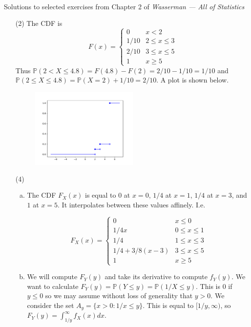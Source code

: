 \documentclass[10pt]{article}
\renewcommand{\P}{\mathbb{P}}
\begin{document}
\noindent \large{Solutions to selected exercises from Chapter 2 of
\emph{Wasserman --- All of Statistics}}

\begin{enumerate}
\item[(2)]
The CDF is
\[
F(x) =
    \begin{cases}
      0 & x < 2 \\
      1/10 & 2\leq x\leq 3 \\
      2/10 & 3\leq x \leq 5 \\
      1 & x\geq 5
   \end{cases}
\]
Thus $\P(2<X\leq 4.8) = F(4.8)-F(2)=2/10-1/10=1/10$ and
$\P(2\leq X\leq 4.8)=\P(X=2)+1/10=2/10$. A plot is shown below.

\begin{figure}[h]
\centering
\includegraphics[width=0.5\textwidth]{2.pdf}
\end{figure}

\item[(4)]

\begin{enumerate}[(a)]
\item The CDF $F_X(x)$ is equal to $0$ at $x=0$, $1/4$ at $x=1$, $1/4$ at $x=3$,
and $1$ at $x=5$. It interpolates between these values affinely. I.e.

\[
F_X(x) =
\begin{cases}
0 & x \leq 0 \\
1/4x & 0\leq x\leq 1\\
1/4 & 1\leq x \leq 3 \\
1/4 + 3/8(x-3) & 3\leq x \leq 5\\
1 & x\geq 5
\end{cases}
\]

\item We will compute $F_Y(y)$ and take its derivative to compute $f_Y(y)$.
We want to calculate $F_Y(y)=\P(Y\leq y)=\P(1/X \leq y)$. This is 0 if $y\leq 0$
so we may assume without loss of generality that $y>0$.
We consider the set $A_y=\{x>0:1/x\leq y\}$. This is equal to $[1/y,\infty)$,
so $F_Y(y)=\int_{1/y}^\infty f_X(x)dx$.


\end{enumerate}
\end{enumerate}
\end{document}
